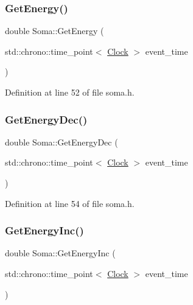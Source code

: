 \subsubsection{\texorpdfstring{Get\+Energy()}{GetEnergy()}}
{\footnotesize\ttfamily double Soma\+::\+Get\+Energy (\begin{DoxyParamCaption}\item[{std\+::chrono\+::time\+\_\+point$<$ \hyperlink{universe_8h_a0ef8d951d1ca5ab3cfaf7ab4c7a6fd80}{Clock} $>$}]{event\+\_\+time }\end{DoxyParamCaption})\hspace{0.3cm}{\ttfamily [inline]}}



Definition at line 52 of file soma.\+h.

\mbox{\label{class_soma_afbdc1f4e4f54adefea9a16fdca50aab5}} 
\subsubsection{\texorpdfstring{Get\+Energy\+Dec()}{GetEnergyDec()}}
{\footnotesize\ttfamily double Soma\+::\+Get\+Energy\+Dec (\begin{DoxyParamCaption}\item[{std\+::chrono\+::time\+\_\+point$<$ \hyperlink{universe_8h_a0ef8d951d1ca5ab3cfaf7ab4c7a6fd80}{Clock} $>$}]{event\+\_\+time }\end{DoxyParamCaption})\hspace{0.3cm}{\ttfamily [inline]}}



Definition at line 54 of file soma.\+h.

\mbox{\label{class_soma_a5d698a7ad270ad4ea63a3de5f25fa760}} 
\subsubsection{\texorpdfstring{Get\+Energy\+Inc()}{GetEnergyInc()}}
{\footnotesize\ttfamily double Soma\+::\+Get\+Energy\+Inc (\begin{DoxyParamCaption}\item[{std\+::chrono\+::time\+\_\+point$<$ \hyperlink{universe_8h_a0ef8d951d1ca5ab3cfaf7ab4c7a6fd80}{Clock} $>$}]{event\+\_\+time }\end{DoxyParamCaption})\hspace{0.3cm}{\ttfamily [inline]}}



